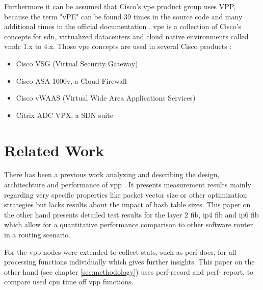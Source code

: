 Furthermore it can be assumed that Cisco's \Ac{vpe} product group uses
VPP, because the term "vPE" can be found 39 times in the source code
and many additional times in the official documentation
\cite{vppdocs}. \Ac{vpe} is a collection of Cisco's concepts for
\Ac{sdn}, virtualized datacenters and cloud native environments called
\Ac{vmdc} 1.x to 4.x. Those \Ac{vpe} concepts are used in several
Cisco products \cite{cisco:sdn}:

\begin{itemize}
	\item Cisco VSG (Virtual Security Gateway)
	\item Cisco ASA 1000v, a Cloud Firewall
	\item Cisco vWAAS (Virtual Wide Area Applications Services)
	\item Citrix ADC VPX, a SDN suite
\end{itemize}


\section{Related Work}


There has been a previous work analyzing and describing the design,
architechture and performance of \Ac{vpp} \cite{linguaglossa2017high}.
It presents measurement results mainly regarding very specific
properties like packet vector size or other optimization strategies
but lacks results about the impact of hash table sizes. This paper on
the other hand presents detailed test results for the layer 2
\Ac{fib}, \Ac{ip4} \Ac{fib} and \Ac{ip6} \Ac{fib} which allow for a
quantitative performance comparison to other software router in a
routing scenario.


For \cite{linguaglossa2017high} the vpp nodes were extended to collect
stats, such as \Ac{perf} does, for all processing functions
individually which gives further insights. This paper on the other
hand (see chapter \ref{sec:methodology}) uses perf-record and perf-
report, to compare used cpu time off \Ac{vpp} functions.



